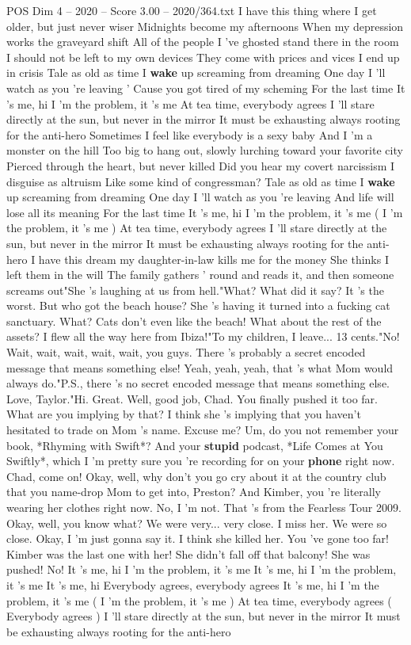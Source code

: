 \begin{textsample}{POS Dim 4 – 2020 – Score 3.00 – 2020/364.txt}  \label{ex:f4_pos_023}
I have this thing where I get older, but just never wiser Midnights become my afternoons When my depression works the graveyard shift All of the people I 've ghosted stand there in the room I should not be left to my own devices They come with prices and vices I end up in crisis Tale as old as time I \textbf{wake} up screaming from dreaming One day I 'll watch as you 're leaving ' Cause you got tired of my scheming For the last time It 's me, hi I 'm the problem, it 's me At tea time, everybody agrees I 'll stare directly at the sun, but never in the mirror It must be exhausting always rooting for the anti-hero Sometimes I feel like everybody is a sexy baby And I 'm a monster on the hill Too big to hang out, slowly lurching toward your favorite city Pierced through the heart, but never killed Did you hear my covert narcissism I disguise as altruism Like some kind of congressman?
Tale as old as time I \textbf{wake} up screaming from dreaming One day I 'll watch as you 're leaving And life will lose all its meaning For the last time It 's me, hi I 'm the problem, it 's me ( I 'm the problem, it 's me ) At tea time, everybody agrees I 'll stare directly at the sun, but never in the mirror It must be exhausting always rooting for the anti-hero I have this dream my daughter-in-law kills me for the money She thinks I left them in the will The family gathers ' round and reads it, and then someone screams out"She 's laughing at us from hell."What?
What did it say?
It 's the worst.
But who got the beach house?
She 's having it turned into a fucking cat sanctuary.
What?
Cats don't even like the beach!
What about the rest of the assets?
I flew all the way here from Ibiza!"To my children, I leave... 13 cents."No!
Wait, wait, wait, wait, wait, you guys.
There 's probably a secret encoded message that means something else!
Yeah, yeah, yeah, that 's what Mom would always do."P.S., there 's no secret encoded message that means something else.
Love, Taylor."Hi.
Great.
Well, good job, Chad.
You finally pushed it too far.
What are you implying by that?
I think she 's implying that you haven't hesitated to trade on Mom 's name.
Excuse me?
Um, do you not remember your book, *Rhyming with Swift*?
And your \textbf{stupid} podcast, *Life Comes at You Swiftly*, which I 'm pretty sure you 're recording for on your \textbf{phone} right now.
Chad, come on!
Okay, well, why don't you go cry about it at the country club that you name-drop Mom to get into, Preston?
And Kimber, you 're literally wearing her clothes right now.
No, I 'm not.
That 's from the Fearless Tour 2009.
Okay, well, you know what?
We were very... very close.
I miss her.
We were so close.
Okay, I 'm just gonna say it.
I think she killed her.
You 've gone too far!
Kimber was the last one with her!
She didn't fall off that balcony!
She was pushed!
No!
It 's me, hi I 'm the problem, it 's me It 's me, hi I 'm the problem, it 's me It 's me, hi Everybody agrees, everybody agrees It 's me, hi I 'm the problem, it 's me ( I 'm the problem, it 's me ) At tea time, everybody agrees ( Everybody agrees ) I 'll stare directly at the sun, but never in the mirror It must be exhausting always rooting for the anti-hero

\end{textsample}
